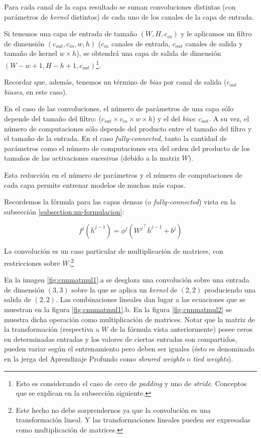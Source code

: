 Para cada canal de la capa resultado se suman convoluciones distintas (con parámetros de \textit{kernel} distintos) de cada uno de los canales de la capa de entrada. 

Si tenemos una capa de entrada de tamaño $(W,H,c_{in})$ y le aplicamos un filtro de dimensión $(c_{out},c_{in},w,h)$ ($c_{in}$ canales de entrada, $c_{out}$ canales de salida y tamaño de kernel $w \times h$), se obtendrá una capa de salida de dimensión $(W-w+1, H-h+1, c_{out})$\footnote{Esto es considerando el caso de cero de \textit{padding} y uno de \textit{stride}. Conceptos que se explican en la subsección siguiente.}.  

Recordar que, además, tenemos un término de \textit{bias} por canal de salida ($c_{out}$ \textit{biases}, en este caso).

En el caso de las convoluciones, el número de parámetros de una capa sólo depende del tamaño del filtro: ($c_{out} \times c_{in} \times w \times h$) y el del \textit{bias}: $c_{out}$. A su vez, el número de computaciones sólo depende del producto entre el tamaño del filtro y el tamaño de la entrada. En el caso \textit{fully-connected}, tanto la cantidad de parámetros como el número de computaciones era del orden del producto de los tamaños de las activaciones sucesivas (debido a la matriz $W$). 

Esta reducción en el número de parámetros y el número de computaciones de cada capa permite entrenar modelos de muchas más capas.

Recordemos la fórmula para las capas densas (o \textit{fully-connected}) vista en la subsección \ref{subsection:nn-formulacion}:

\begin{equation*}
    f^j(\bar{h}^{j-1}) = \phi^j( {W^j}^\top \bar{h}^{j-1} + b^j)
\end{equation*}

La convolución es un caso particular de multiplicación de matrices, con restricciones sobre $W$.\footnote{Este hecho no debe sorprendernos ya que la convolución es una transformación lineal. Y las transformaciones lineales pueden ser expresadas como multiplicación de matrices.}

En la imagen \ref{fig:cnnmatmul1}.a se desgloza una convolución sobre una entrada de dimensión $(3,3)$ sobre la que se aplica un \textit{kernel} de $(2,2)$ produciendo una salida de $(2,2)$. Las combinaciones lineales dan lugar a las ecuaciones que se muestran en la figura \ref{fig:cnnmatmul1}.b. 
En la figura \ref{fig:cnnmatmul2} se muestra dicha operación como multiplicación de matrices. Notar que la matriz de la transformación (respectiva a $W$ de la fórmula vista anteriormente) posee ceros en determinadas entradas y los valores de ciertas entradas son compartidos, pueden variar según el entrenamiento pero deben ser iguales (ésto es  denominado en la jerga del Aprendizaje Profundo como \textit{shrared weights} o \textit{tied weights}).

